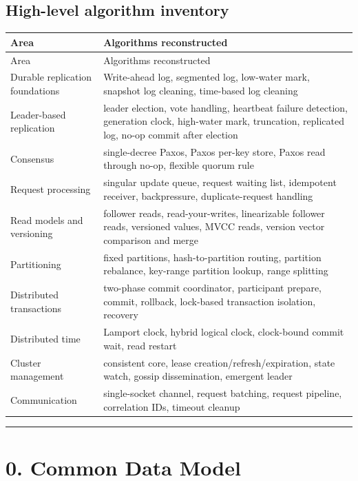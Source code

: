 \documentclass[10pt,letterpaper]{article}
\begin{document}
\subsection*{High-level algorithm inventory}

\begin{longtable}{L{0.29\textwidth}L{0.64\textwidth}}
\toprule
Area & Algorithms reconstructed \\
\midrule\endfirsthead
\toprule
Area & Algorithms reconstructed \\
\midrule\endhead
Durable replication foundations & Write-ahead log, segmented log, low-water mark, snapshot log cleaning, time-based log cleaning \\
Leader-based replication & leader election, vote handling, heartbeat failure detection, generation clock, high-water mark, truncation, replicated log, no-op commit after election \\
Consensus & single-decree Paxos, Paxos per-key store, Paxos read through no-op, flexible quorum rule \\
Request processing & singular update queue, request waiting list, idempotent receiver, backpressure, duplicate-request handling \\
Read models and versioning & follower reads, read-your-writes, linearizable follower reads, versioned values, MVCC reads, version vector comparison and merge \\
Partitioning & fixed partitions, hash-to-partition routing, partition rebalance, key-range partition lookup, range splitting \\
Distributed transactions & two-phase commit coordinator, participant prepare, commit, rollback, lock-based transaction isolation, recovery \\
Distributed time & Lamport clock, hybrid logical clock, clock-bound commit wait, read restart \\
Cluster management & consistent core, lease creation/refresh/expiration, state watch, gossip dissemination, emergent leader \\
Communication & single-socket channel, request batching, request pipeline, correlation IDs, timeout cleanup \\
\bottomrule
\end{longtable}

\medskip\hrule\medskip

\clearpage
\section*{0. Common Data Model}
\end{document}
